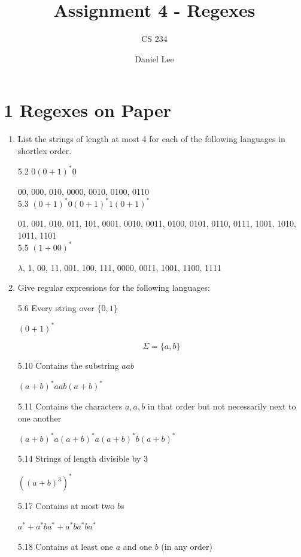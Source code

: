 \documentclass[10pt]{article}
\title{Assignment 4 - Regexes}
\author{CS 234}
\date{Daniel Lee}
\begin{document}
\maketitle

\section*{1 \quad Regexes on Paper}

\begin{enumerate}[label={}]
      \item List the strings of length at most 4 for each of the following languages in shortlex order.


            5.2 $0(0+1)^* 0$

            00, 000, 010, 0000, 0010, 0100, 0110\\

            5.3 $(0+1)^* 0(0+1)^* 1(0+1)^*$

            01, 001, 010, 011, 101, 0001, 0010, 0011, 0100, 0101, 0110, 0111, 1001, 1010, 1011, 1101\\

            5.5 $(1+00)^*$

            $\lambda$, 1, 00, 11, 001, 100, 111, 0000, 0011, 1001, 1100, 1111\\

      \item Give regular expressions for the following languages:

            5.6 Every string over $\{0,1\}$

            $(0+1)^*$

            \[\Sigma = \{a, b\}\]

            5.10 Contains the substring $a a b$

            $(a+b)^*aab(a+b)^*$

            5.11 Contains the characters $a, a, b$ in that order but not necessarily next to one another

            $(a+b)^*a(a+b)^*a(a+b)^*b(a+b)^*$

            5.14 Strings of length divisible by 3

            $((a+b)^3)^*$

            5.17 Contains at most two $b$s

            $a^* + a^*ba^* + a^*ba^*ba^*$

            5.18 Contains at least one $a$ and one $b$ (in any order)


\end{enumerate}
\end{document}

